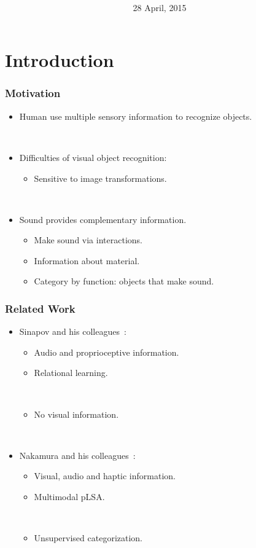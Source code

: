 \documentclass{beamer}
\title{\trtitle \\ \vspace{5pt} \footnotesize \trtype}
\author{\trauthor \\ \vspace{5pt} \footnotesize \trfach}
\date{28 April, 2015}
\begin{document}
\frame{\titlepage}


\section{Introduction}
\begin{frame}
  \frametitle{Motivation}

  \begin{itemize}
    \item Human use multiple sensory information to recognize objects.

      ~
    \item Difficulties of visual object recognition:
      \begin{itemize}
        \item Sensitive to image transformations. 
      \end{itemize}

      ~
    \item Sound provides complementary information.
      \begin{itemize}
        \item Make sound via interactions.
        \item Information about material. 
        \item Category by function: objects that make sound.
      \end{itemize}
  \end{itemize}
\end{frame}

\begin{frame}
  \frametitle{Related Work}

  \begin{itemize}
    \item Sinapov and his colleagues~\cite{sinapov_interactive_2009,sinapov_object_2011}: 
      \begin{itemize}
        \item Audio and proprioceptive information.
        \item Relational learning.

          ~
        \item No visual information.
      \end{itemize}

      ~
    \item Nakamura and his colleagues~\cite{nakamura_multimodal_2007,nakamura_bag_2012}:
      \begin{itemize}
        \item Visual, audio and haptic information.
        \item Multimodal pLSA.

          ~
        \item Unsupervised categorization.
      \end{itemize}
  \end{itemize}
\end{frame}
\end{document}
